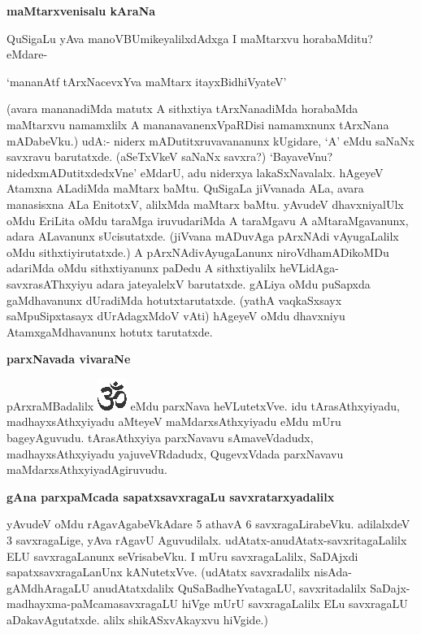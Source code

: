 {\bigskip
\noindent
{\large\bf maMtarxvenisalu kAraNa}}\label{page120}
\medskip

\noindent 
QuSigaLu yAva manoVBUmikeyalilxdAdxga I maMtarxvu horabaMditu? eMdare-
 
 \begin{shloka}
 `mananAtf tArxNacevxYva maMtarx itayxBidhiVyateV'\label{121}
 \end{shloka}

\noindent
(avara mananadiMda matutx A sithxtiya tArxNanadiMda horabaMda maMtarxvu namamxlilx A mananavanenxV\-paRDisi namamxnunx tArxNana mADabeVku.) udA:- niderx
mADutitxruvavananunx kUgidare, `A' eMdu saNaNx savxravu barutatxde. (aSeTxVkeV saNaNx savxra?) `BayaveVnu? nidedxmADutitxdedxVne' eMdarU, adu niderxya lakaSxNa\-valalx. hAgeyeV Atamxna ALadiMda maMtarx baMtu. QuSigaLa jiVvanada ALa, avara manasisxna ALa EnitotxV, alilxMda maMtarx baMtu. yAvudeV dhavxniyalUlx oMdu EriLita oMdu taraMga iruvudariMda A taraM\-gavu A aMtaraMgavanunx, adara ALavanunx sUcisutatxde. (jiVvana mADuvAga pArxNAdi vAyu\-gaLalilx oMdu sithxti\-yirutatxde.) A pArxNAdivAyugaLanunx niroVdhamADikoMDu adariMda oMdu sithxtiyanunx paDedu A sithxtiyalilx heVLidAga-savxrasAThxyiyu adara jateyalelxV barutatxde. gALiya oMdu puSapxda gaMdha\-vanunx dUradiMda hotutxtarutatxde. (yathA vaqkaSxsayx\label{121} saMpuSipxtasayx dUrAdagxMdoV vAti) hAgeyeV oMdu dhavxniyu AtamxgaMdhavanunx hotutx tarutatxde.

{\bigskip
\noindent
{\large\bf parxNavada vivaraNe}}
\medskip

\noindent
pArxraMBadalilx {\includegraphics[scale=.6]{om.eps}} eMdu parxNava heVLutetxVve. idu tArasAthxyiyadu, madhayx\-sAthxyiyadu aMteyeV maMdarx\-sAthxyiyadu eMdu mUru bageyAguvudu. tArasAthxyiya parxNavavu sAmaveVdadudx, madhayx\-sAthxyi\-yadu yajuveVRdadudx, QugevxVdada parxNavavu maMdarxsAthxyiyadAgiruvudu.

{\bigskip
\noindent
{\large\bf gAna parxpaMcada sapatxsavxragaLu savxratarxyadalilx}}
\medskip

\noindent
yAvudeV oMdu rAgavAgabeVkAdare 5 athavA 6 savxragaLirabeVku. adilalxdeV 3 savxragaLige, yAva \-rAgavU Aguvudilalx. udAtatx-anudAtatx-savxritagaLalilx ELU savxragaLanunx seVrisabeVku. I mUru savxra\-gaLalilx, SaDAjxdi sapatxsavxragaLanUnx kANutetxVve. (udAtatx savxradalilx nisAda-gAMdhAragaLU anudAtatxdalilx QuSaBa\-dheYvatagaLU, savxritadalilx SaDajx-madhayxma-paMcamasavxragaLU hiVge mUrU savxragaLalilx ELu savxragaLU aDaka\-vAgu\-tatxde. alilx shikASxvAkayxvu hiVgide.)

